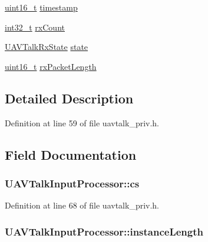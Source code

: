 \begin{DoxyCompactItemize}
\item 
\hyperlink{stdint_8h_a273cf69d639a59973b6019625df33e30}{uint16\-\_\-t} \hyperlink{struct_u_a_v_talk_input_processor_a184962821e9c4b260b39f7bf1c576150}{timestamp}
\item 
\hyperlink{group___n_a_m_e_gafd12020da5a235dfcf0c3c748fb5baed}{int32\-\_\-t} \hyperlink{struct_u_a_v_talk_input_processor_a478ba62595ad5977cbc9c0897e11ee10}{rx\-Count}
\item 
\hyperlink{group___open_pilot_libraries_ga8a49dc52ac01b5d0782811f284df691c}{U\-A\-V\-Talk\-Rx\-State} \hyperlink{struct_u_a_v_talk_input_processor_ae2d58b353cb569cf8fcb956f1b0b3413}{state}
\item 
\hyperlink{stdint_8h_a273cf69d639a59973b6019625df33e30}{uint16\-\_\-t} \hyperlink{struct_u_a_v_talk_input_processor_a39d9853a0ea6695927ffe0930225cfbe}{rx\-Packet\-Length}
\end{DoxyCompactItemize}


\subsection{Detailed Description}


Definition at line 59 of file uavtalk\-\_\-priv.\-h.



\subsection{Field Documentation}
\hypertarget{struct_u_a_v_talk_input_processor_a7e4bd3c94cfc37e346d4ce38445ca742}{
\subsubsection[{cs}]{ U\-A\-V\-Talk\-Input\-Processor\-::cs}}\label{struct_u_a_v_talk_input_processor_a7e4bd3c94cfc37e346d4ce38445ca742}


Definition at line 68 of file uavtalk\-\_\-priv.\-h.

\hypertarget{struct_u_a_v_talk_input_processor_ab2cadd287203a554072316545674d14c}{
\subsubsection[{instance\-Length}]{ U\-A\-V\-Talk\-Input\-Processor\-::instance\-Length}}\label{struct_u_a_v_talk_input_processor_ab2cadd287203a554072316545674d14c}


